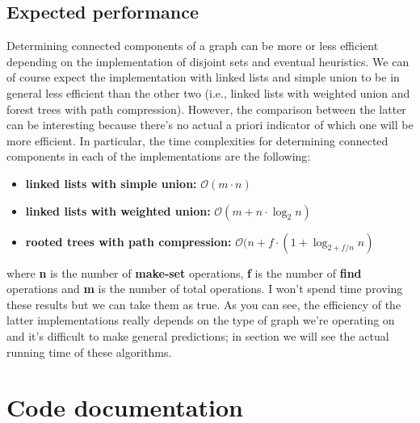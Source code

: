 \documentclass[11pt]{article}
\begin{document}
    \subsection{Expected performance}
    Determining connected components of a graph can be more or less efficient depending on the implementation of disjoint sets and eventual heuristics.
    We can of course expect the implementation with linked lists and simple union to be in general less efficient than the other two (i.e., linked lists with weighted union and forest trees with path compression). However, the comparison between the latter can be interesting because there's no actual a priori indicator of which one will be more efficient.
    In particular, the time complexities for determining connected components in each of the implementations are the following:
    \begin{itemize}
        \item \textbf{linked lists with simple union:} $\mathcal{O}(m\cdot n) $
        \item \textbf{linked lists with weighted union:} $\mathcal{O}(m + n \cdot \log_{2}n)$
        \item \textbf{rooted trees with path compression:} $\mathcal{O}(n + f \cdot (1 + \log_{2+f/n}n)$
    \end{itemize}
    where \textbf{n} is the number of \textbf{make-set} operations, \textbf{f} is the number of \textbf{find} operations and \textbf{m} is the number of total operations. I won't spend time proving these results but we can take them as true. As you can see, the efficiency of the latter implementations really depends on the type of graph we're operating on and it's difficult to make general predictions;  in section we will see the actual running time of these algorithms. 

    \section{Code documentation}
\end{document}
